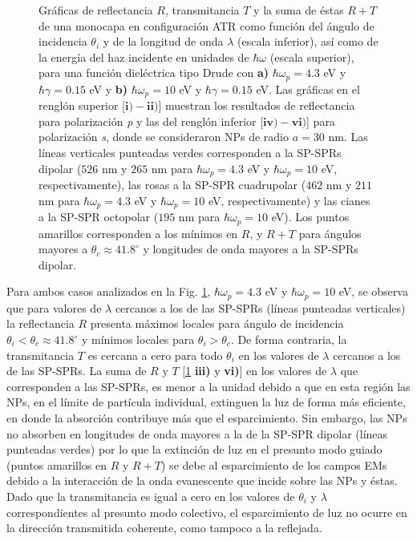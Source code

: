 \begin{figure}[h!]
\begin{subfigure}{.7\linewidth}
		\end{subfigure}\vspace*{-.5em}
	\caption{Gráficas de reflectancia $R$, transmitancia $T$ y la suma de éstas $R+T$ de una monocapa en configuración ATR como función del ángulo de incidencia $\theta_i$ y de la longitud de onda $\lambda$ (escala inferior), así como de la energía del haz incidente en unidades de $\hbar\omega$ (escala superior), para una función dieléctrica tipo Drude con \textbf{a)} $\hbar\omega_p=4. 3$ eV  y  $\hbar\gamma=0. 15$ eV y \textbf{b)} $\hbar\omega_p = 10$ eV y $\hbar\gamma = 0.15$ eV.  Las gráficas   en el renglón superior [$\mathbf{i)-ii)}$]  muestran los resultados de reflectancia para  polarización \emph{p} y las del renglón inferior  [$\mathbf{iv)-vi)}$] para polarización  \emph{s}, donde se consideraron NPs de radio $a=30$ nm. Las líneas verticales punteadas verdes corresponden a la SP-SPRs dipolar ($526$ nm y $265$ nm para $\hbar\omega_p=4.3$ eV y $\hbar\omega_p = 10$ eV, respectivamente), las rosas a la SP-SPR cuadrupolar ($462$ nm y $211$ nm para $\hbar\omega_p=4.3$ eV y $\hbar\omega_p = 10$ eV, respectivamente) y las cianes a la SP-SPR octopolar ($195$ nm para $\hbar\omega_p = 10$ eV). Los puntos amarillos corresponden a los mínimos en $R$, y $R+T$ para ángulos mayores a $\theta_c\approx 41.8^\circ$ y longitudes de onda mayores a la SP-SPRs dipolar. }\label{fig:RT-Omegas}
	\end{figure}	

Para ambos casos analizados en la Fig. \ref{fig:RT-Omegas}, $\hbar\omega_p = 4.3$ eV y $\hbar\omega_p = 10$ eV, se observa que para valores de $\lambda$ cercanos a los de las SP-SPRs (líneas punteadas verticales) la reflectancia $R$ presenta máximos locales para ángulo de incidencia $\theta_i<\theta_c \approx 41.8^\circ$ y mínimos locales para $\theta_i>\theta_c$. De forma contraria, la transmitancia $T$ es cercana a cero para todo $\theta_i$ en los valores de $\lambda$ cercanos a los de las SP-SPRs. La suma de $R$ y $T$ [\ref{fig:RT-Omegas} \textbf{iii)} y \textbf{vi)}] en los valores de $\lambda$ que corresponden a las SP-SPRs, es menor a la unidad debido a que en esta región las NPs, en el límite de partícula individual, extinguen la luz de forma más eficiente, en donde la absorción contribuye más que el esparcimiento. Sin embargo, las NPs no absorben en longitudes de onda mayores a la de la SP-SPR dipolar (líneas punteadas verdes) por lo que la extinción de luz en el presunto modo guiado (puntos amarillos en $R$ y $R+T$) se debe al esparcimiento de los campos EMs debido a la interacción de la onda evanescente que incide sobre las NPs y éstas. Dado que la transmitancia es igual a cero en los valores de $\theta_i$ y $\lambda$ correspondientes al presunto modo colectivo, el esparcimiento de luz no ocurre en la dirección transmitida coherente, como tampoco a la reflejada. 

